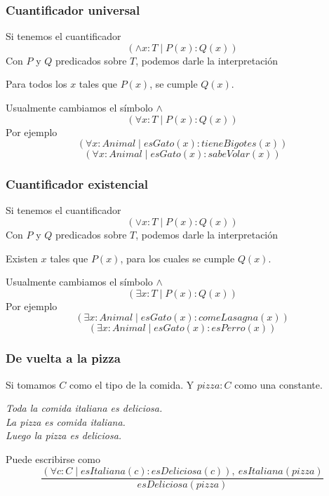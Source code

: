 \documentclass{beamer}
\begin{document}
\begin{frame}[fragile]
    \frametitle{Cuantificador universal}
        \pause
        Si tenemos el cuantificador 
        $$(\land x:T \mid P(x) : Q(x))$$
        \pause
        Con $P$ y $Q$ predicados sobre $T$, podemos darle la interpretación
        \pause
        \begin{center}
            Para todos los $x$ tales que $P(x)$, se cumple $Q(x)$.
        \end{center}
        \pause
        Usualmente cambiamos el símbolo $\land$
        $$(\forall x:T \mid P(x) : Q(x))$$
        \pause
        Por ejemplo
        \pause
        $$(\forall x:Animal \mid esGato(x) : tieneBigotes(x))$$
        \pause
        $$(\forall x:Animal \mid esGato(x) : sabeVolar(x))$$
\end{frame}

\begin{frame}[fragile]
    \frametitle{Cuantificador existencial}
        \pause
        Si tenemos el cuantificador 
        $$(\lor x:T \mid P(x) : Q(x))$$
        \pause
        Con $P$ y $Q$ predicados sobre $T$, podemos darle la interpretación
        \pause
        \begin{center}
            Existen $x$ tales que $P(x)$, para los cuales se cumple $Q(x)$.
        \end{center}
        \pause
        Usualmente cambiamos el símbolo $\land$
        $$(\exists x:T \mid P(x) : Q(x))$$
        \pause
        Por ejemplo
        \pause
        $$(\exists x:Animal \mid esGato(x) : comeLasagna(x))$$
        \pause
        $$(\exists x:Animal \mid esGato(x) : esPerro(x))$$
\end{frame}

\begin{frame}[fragile]
    \frametitle{De vuelta a la pizza}
    \pause
    Si tomamos $C$ como el tipo de la comida. Y $pizza:C$ como una constante.
    \pause
    \begin{center}
        \textit{Toda la comida italiana es deliciosa.\\ 
        La pizza es comida italiana.\\
        Luego la pizza es deliciosa.}
    \end{center}
    \pause
    Puede escribirse como
    $$\frac{(\forall c: C \mid esItaliana(c): esDeliciosa(c)),\ esItaliana(pizza)}{esDeliciosa(pizza)}$$
\end{frame}
\end{document}
